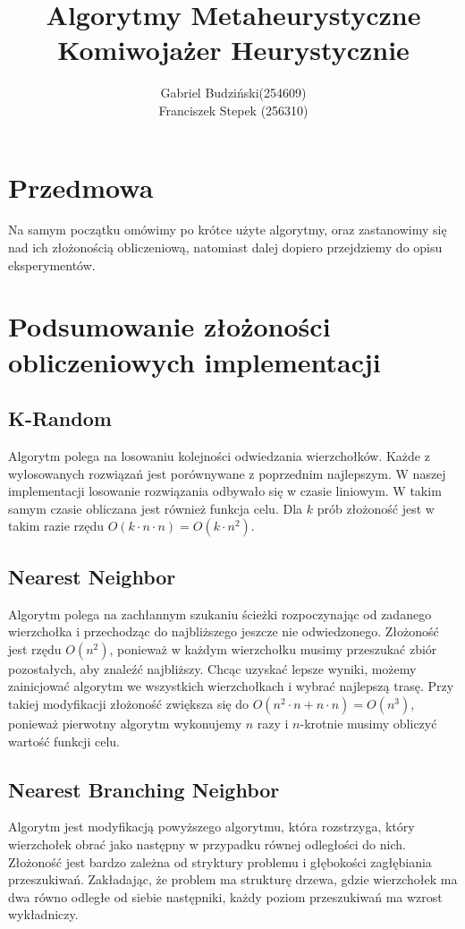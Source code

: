 \documentclass{article}
\title{\textbf{Algorytmy Metaheurystyczne\\Komiwojażer Heurystycznie}}
\author{Gabriel Budziński(254609)\\Franciszek Stepek (256310)}
\date{}
\begin{document}
 
\maketitle

\section*{Przedmowa}
Na samym początku omówimy po krótce użyte algorytmy, oraz zastanowimy się nad ich złożonością obliczeniową, natomiast dalej dopiero przejdziemy do opisu eksperymentów.

\section{Podsumowanie złożoności obliczeniowych implementacji}
\subsection{K-Random}
Algorytm polega na losowaniu kolejności odwiedzania wierzchołków. Każde z wylosowanych rozwiązań jest porównywane z poprzednim najlepszym. W naszej implementacji losowanie rozwiązania odbywało się w czasie liniowym. W takim samym czasie obliczana jest również funkcja celu. Dla $k$ prób złożoność jest w takim razie rzędu $O(k\cdot n\cdot n) = O(k \cdot n^2)$.

\subsection{Nearest Neighbor}
Algorytm polega na zachłannym szukaniu ścieżki rozpoczynając od zadanego wierzchołka i przechodząc do najbliższego jeszcze nie odwiedzonego. Złożoność jest rzędu $O(n^2)$, ponieważ w każdym wierzchołku musimy przeszukać zbiór pozostałych, aby znaleźć najbliższy. Chcąc uzyskać lepsze wyniki, możemy zainicjować algorytm we wszystkich wierzchołkach i wybrać najlepszą trasę. Przy takiej modyfikacji złożoność zwiększa się do $O(n^2 \cdot n + n\cdot n) = O(n^3)$, ponieważ pierwotny algorytm wykonujemy $n$ razy i $n$-krotnie musimy obliczyć wartość funkcji celu.

\subsection{Nearest Branching Neighbor}
Algorytm jest modyfikacją powyższego algorytmu, która rozstrzyga, który wierzchołek obrać jako następny w przypadku równej odległości do nich. Złożoność jest bardzo zależna od stryktury problemu i głębokości zagłębiania przeszukiwań. Zakładając, że problem ma strukturę drzewa, gdzie wierzchołek ma dwa równo odległe od siebie następniki, każdy poziom przeszukiwań ma wzrost wykładniczy.
\end{document}
